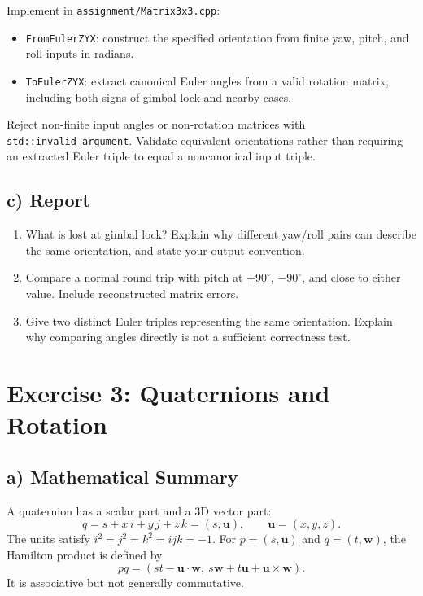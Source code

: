 \documentclass[11pt,a4paper]{article}
\newcommand{\vect}[1]{\bm{#1}}
\begin{document}
Implement in \texttt{assignment/Matrix3x3.cpp}:
\begin{itemize}[leftmargin=*]
    \item \texttt{FromEulerZYX}: construct the specified orientation from
    finite yaw, pitch, and roll inputs in radians.
    \item \texttt{ToEulerZYX}: extract canonical Euler angles from a valid
    rotation matrix, including both signs of gimbal lock and nearby cases.
\end{itemize}

Reject non-finite input angles or non-rotation matrices with
\texttt{std::invalid\_argument}. Validate equivalent orientations rather than
requiring an extracted Euler triple to equal a noncanonical input triple.

\subsection*{c) Report}
\begin{enumerate}[leftmargin=*]
    \item What is lost at gimbal lock? Explain why different yaw/roll pairs can
    describe the same orientation, and state your output convention.
    \item Compare a normal round trip with pitch at $+90^\circ$, $-90^\circ$,
    and close to either value. Include reconstructed matrix errors.
    \item Give two distinct Euler triples representing the same orientation.
    Explain why comparing angles directly is not a sufficient correctness test.
\end{enumerate}

\section*{Exercise 3: Quaternions and Rotation}

\subsection*{a) Mathematical Summary}

A quaternion has a scalar part and a 3D vector part:
\[
q=s+x\,i+y\,j+z\,k=(s,\vect{u}),\qquad
\vect{u}=(x,y,z).
\]
The units satisfy $i^2=j^2=k^2=ijk=-1$. For
$p=(s,\vect{u})$ and $q=(t,\vect{w})$, the Hamilton product is defined by
\[
pq=(st-\vect{u}\cdot\vect{w},\
s\vect{w}+t\vect{u}+\vect{u}\times\vect{w}).
\]
It is associative but not generally commutative.
\end{document}
